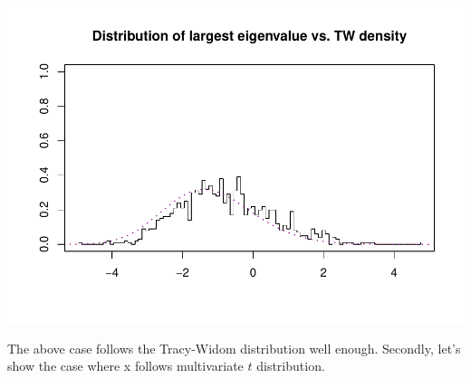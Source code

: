 \documentclass[
]{article}
\begin{document}
\includegraphics{A5_files/figure-latex/unnamed-chunk-24-2.pdf}

The above case follows the Tracy-Widom distribution well enough.
Secondly, let's show the case where x follows multivariate \(t\)
distribution.
\end{document}
